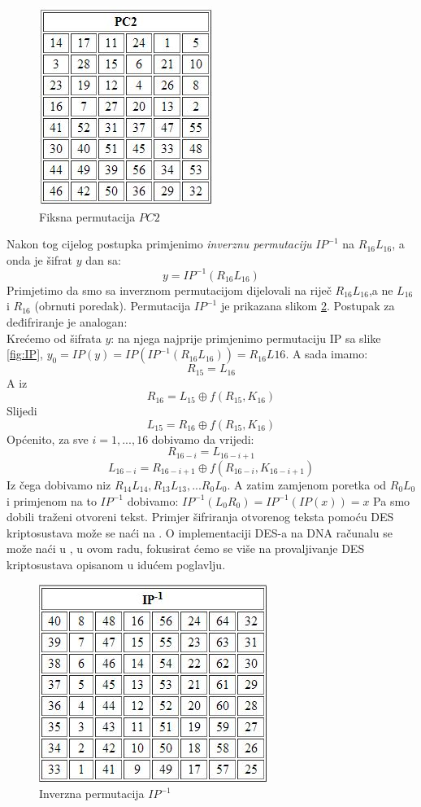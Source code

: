 \documentclass[a4paper,oneside,12pt]{memoir} %
\begin{document}
\begin{spacing}{1.5}
\begin{figure}[h]
\centering \includegraphics[scale=0.8]{PC2.jpg}
\caption{Fiksna permutacija $PC2$}
\label{fig:PC2}
\end{figure}

Nakon tog cijelog postupka primjenimo \textit{inverznu permutaciju} $IP^{-1}$ na $R_{16}L_{16}$, a onda je šifrat $y$ dan sa:
\[y=IP^{-1}(R_{16}L_{16})\]
Primjetimo da smo sa inverznom permutacijom dijelovali na riječ $R_{16}L_{16}$,a ne $L_{16}$ i $R_{16}$ (obrnuti poredak). Permutacija $IP^{-1}$ je prikazana slikom \ref{fig:invIP}.
Postupak za deđifriranje je analogan:\\
Krećemo od šifrata $y$: na njega najprije primjenimo permutaciju IP sa slike \ref{fig:IP}, $y_0=IP(y)=IP(IP^{-1}(R_{16}L_{16}))=R_{16}L{16}$.  A sada imamo:
\[R_{15}=L_{16}\]
A iz 
\[R_{16}=L_{15} \oplus f(R_{15}, K_{16})\]
Slijedi
\[L_{15}=R_{16} \oplus f(R_{15}, K_{16})\]
Općenito, za sve $i=1,...,16$ dobivamo da vrijedi:
\[R_{16-i}=L_{16-i+1}\]
\[L_{16-i}=R_{16-i+1} \oplus f(R_{16-i}, K_{16-i+1})\]
Iz čega dobivamo niz $R_{14}L_{14},R_{13}L_{13},...R_{0}L_{0}$. A zatim zamjenom poretka od $R_{0}L_{0}$ i primjenom na to $IP^{-1}$ dobivamo:
$IP^{-1}(L_0R_0)=IP^{-1}(IP(x))=x$
Pa smo dobili traženi otvoreni tekst. Primjer šifriranja otvorenog teksta pomoću DES kriptosustava može se naći na \cite{DESexa}. O implementaciji DES-a na DNA računalu se može naći u \cite{DESDNA}, u ovom radu, fokusirat ćemo se više na provaljivanje DES kriptosustava opisanom u idućem poglavlju.
\begin{figure}[h]
\centering \includegraphics[scale=0.7]{invIP.jpg}
\caption{Inverzna permutacija $IP^{-1}$}
\label{fig:invIP}
\end{figure}


\end{spacing}
\end{document}
